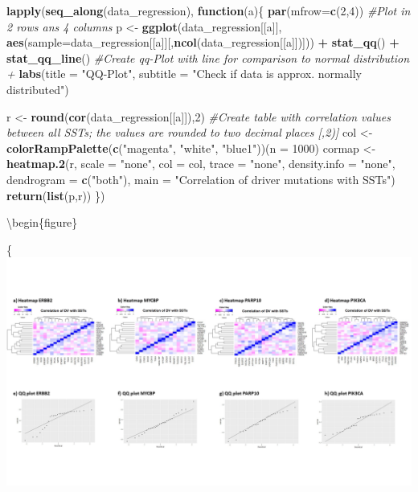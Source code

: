 \documentclass[]{article}
\newenvironment{Shaded}{\begin{snugshade}}{\end{snugshade}}
\newcommand{\CommentTok}[1]{\textcolor[rgb]{0.56,0.35,0.01}{\textit{#1}}}
\newcommand{\ControlFlowTok}[1]{\textcolor[rgb]{0.13,0.29,0.53}{\textbf{#1}}}
\newcommand{\DataTypeTok}[1]{\textcolor[rgb]{0.13,0.29,0.53}{#1}}
\newcommand{\DecValTok}[1]{\textcolor[rgb]{0.00,0.00,0.81}{#1}}
\newcommand{\KeywordTok}[1]{\textcolor[rgb]{0.13,0.29,0.53}{\textbf{#1}}}
\newcommand{\NormalTok}[1]{#1}
\newcommand{\OperatorTok}[1]{\textcolor[rgb]{0.81,0.36,0.00}{\textbf{#1}}}
\newcommand{\StringTok}[1]{\textcolor[rgb]{0.31,0.60,0.02}{#1}}
\begin{document}
\begin{Shaded}
\begin{Highlighting}[]
\KeywordTok{lapply}\NormalTok{(}\KeywordTok{seq_along}\NormalTok{(data_regression), }\ControlFlowTok{function}\NormalTok{(a)\{  }
  \KeywordTok{par}\NormalTok{(}\DataTypeTok{mfrow=}\KeywordTok{c}\NormalTok{(}\DecValTok{2}\NormalTok{,}\DecValTok{4}\NormalTok{)) }\CommentTok{#Plot in 2 rows ans 4 columns}
\NormalTok{  p <-}\StringTok{ }\KeywordTok{ggplot}\NormalTok{(data_regression[[a]], }\KeywordTok{aes}\NormalTok{(}\DataTypeTok{sample=}\NormalTok{data_regression[[a]][,}\KeywordTok{ncol}\NormalTok{(data_regression[[a]])])) }\OperatorTok{+}\StringTok{ }\KeywordTok{stat_qq}\NormalTok{() }\OperatorTok{+}\StringTok{           }\KeywordTok{stat_qq_line}\NormalTok{() }\CommentTok{#Create qq-Plot with line for comparison to normal distribution +}
        \KeywordTok{labs}\NormalTok{(}\DataTypeTok{title =} \StringTok{"QQ-Plot"}\NormalTok{, }\DataTypeTok{subtitle =} \StringTok{"Check if data is approx. normally distributed"}\NormalTok{) }
          
\NormalTok{  r <-}\StringTok{  }\KeywordTok{round}\NormalTok{(}\KeywordTok{cor}\NormalTok{(data_regression[[a]]),}\DecValTok{2}\NormalTok{) }\CommentTok{#Create table with correlation values between all SSTs; the values are rounded to two decimal places [,2)]}
\NormalTok{  col <-}\StringTok{ }\KeywordTok{colorRampPalette}\NormalTok{(}\KeywordTok{c}\NormalTok{(}\StringTok{"magenta"}\NormalTok{, }\StringTok{"white"}\NormalTok{, }\StringTok{"blue1"}\NormalTok{))(}\DataTypeTok{n =} \DecValTok{1000}\NormalTok{)}
\NormalTok{  cormap <-}\StringTok{ }\KeywordTok{heatmap.2}\NormalTok{(r, }\DataTypeTok{scale =} \StringTok{"none"}\NormalTok{, }\DataTypeTok{col =}\NormalTok{ col, }
          \DataTypeTok{trace =} \StringTok{"none"}\NormalTok{, }\DataTypeTok{density.info =} \StringTok{"none"}\NormalTok{, }\DataTypeTok{dendrogram =} \KeywordTok{c}\NormalTok{(}\StringTok{"both"}\NormalTok{), }\DataTypeTok{main =} \StringTok{"Correlation of driver mutations with SSTs"}\NormalTok{)}
  \KeywordTok{return}\NormalTok{(}\KeywordTok{list}\NormalTok{(p,r)) }
\NormalTok{   \})}
\end{Highlighting}
\end{Shaded}

\textbackslash begin\{figure\}

\{\centering \includegraphics[width=1\linewidth]{File1}
\end{document}
